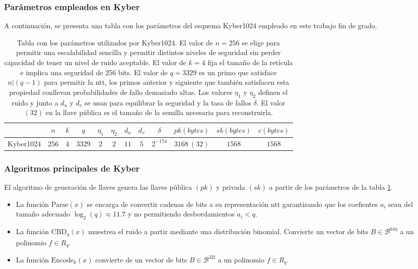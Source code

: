 \subsubsection{Parámetros empleados en Kyber}
A continuación, se presenta una tabla con los parámetros del esquema Kyber1024 empleado en este trabajo fin de grado.
\begin{table}[h]
	\centering
	\renewcommand{\arraystretch}{1.2}
	\begin{tabular}{lccccccccccc}
		\hline
		&\(n\)&\(k\)&\(q\)&\(\eta_1\)&\(\eta_2\)&\(d_u\)&\(d_v\)&\(\delta\)&\(pk (bytes)\)&\(sk (bytes)\)&\(c (bytes)\)\\
		\hline
		Kyber1024&\(256\)&\(4\)&\(3329\)&\(2\)&\(2\)&\(11\)&\(5\)&\(2^{-174}\)&\(3168 \ (32)\)&\(1568\)&\(1568\)\\
		\hline
	\end{tabular}
	\caption{Tabla con los parámetros utilizados por Kyber1024. El valor de \(n=256\) se elige para permitir una escalabilidad sencilla y permitir distintos niveles de seguridad sin perder capacidad de tener un nivel de ruido aceptable. El valor de \(k=4\) fija el tamaño de la retícula e implica una seguridad de 256 bits. El valor de \(q=3329\) es un primo que satisface \(n|(q-1)\) para permitir la \gls{ntt}, los primos anterior y siguiente que también satisfacen esta propiedad conllevan probabilidades de fallo demasiado altas. Los valores $\eta_1$ y $\eta_2$ definen el ruido y junto a \(d_u\) y \(d_v\) se usan para equilibrar la seguridad y la tasa de fallos $\delta$. El valor \((32)\) en la llave pública es el tamaño de la semilla necesaria para reconstruirla.}
	\label{tab:KyberParams}
\end{table}

\subsubsection{Algoritmos principales de Kyber \cite{kyber-spec-2021}}
\label{sub:kybAlg}
El algoritmo de generación de llaves genera las llaves pública \((pk)\) y privada \((sk)\) a partir de los parámetros de la tabla \ref{tab:KyberParams}.

\begin{itemize}
	\item La función $\text{Parse}(x)$ se encarga de convertir cadenas de bits a su representación \gls{ntt} garantizando que los coefientes \(a_i\) sean del tamaño adecuado \(\log_2(q)\approx 11.7\) y no permitiendo desbordamientos \(a_i<q\).
	\item La función $\text{CBD}_\eta(x)$ muestrea el ruido a partir mediante una distribución binomial. Convierte un vector de bits \(B\in\mathcal{B}^{64\eta}\) a un polinomio \(f\in R_q\).
	\item La función $\text{Encode}_k(x)$ convierte de un vector de bits \(B\in\mathcal{B}^{32l}\) a un polinomio \(f\in R_q\).
\end{itemize}
   \newpage

